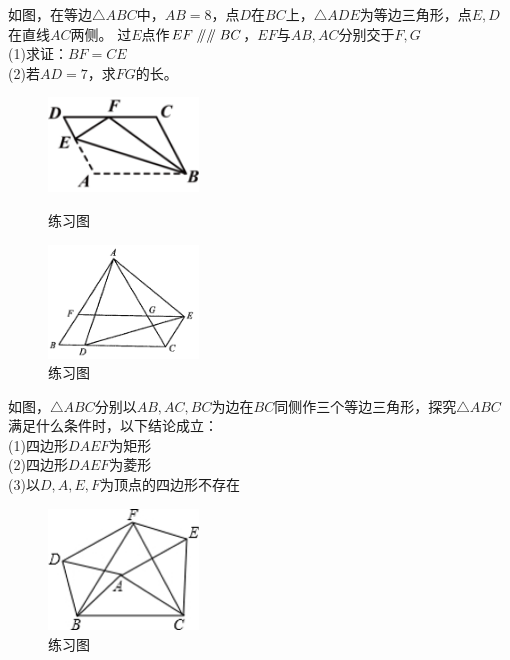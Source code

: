 \documentclass{ecnuthesis}
\newcommand\px{\mathrel{/\mkern-5mu/}}  %
\begin{document}
\begin{problem}
    如图，在等边$\triangle ABC$中，$AB=8$，点$D$在$BC$上，$\triangle ADE$为等边三角形，点$E,D$在直线$AC$两侧。
    过$E$点作$EF\px\px BC$，$EF$与$AB,AC$分别交于$F,G$ \\
    (1)求证：$BF=CE$ \\
    (2)若$AD=7$，求$FG$的长。\\
\end{problem}
\begin{figure}[ht]
\begin{minipage}[t]{0.48\textwidth}
\centering
\includegraphics[width=4cm]{picture/6_2_1.png}
\caption{练习图}
\end{minipage}
\begin{minipage}[t]{0.48\textwidth}
\centering
\includegraphics[width=4cm]{picture/6_2_2.png}
\caption{练习图}
\end{minipage}
\end{figure}
\begin{problem}
    如图，$\triangle ABC$分别以$AB,AC,BC$为边在$BC$同侧作三个等边三角形，探究$\triangle ABC$满足什么条件时，以下结论成立：\\
    (1)四边形$DAEF$为矩形 \\
    (2)四边形$DAEF$为菱形 \\
    (3)以$D,A,E,F$为顶点的四边形不存在
\end{problem}
\begin{figure}[H]
\centering
\includegraphics[width=4cm]{picture/671.png}
\caption{练习图}
\end{figure}
\end{document}
